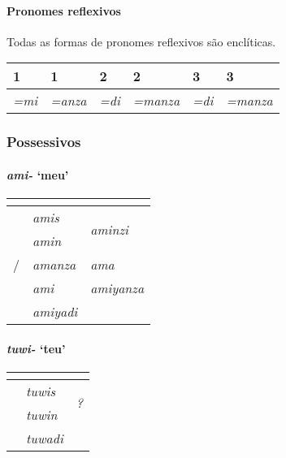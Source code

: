 \paragraph{Pronomes reflexivos}
Todas as formas de pronomes reflexivos são enclíticas.

\begin{center}
	\begin{tabular}[c]{ll|ll|ll}
		\toprule
		1\Sg{}\emph{} & 1\Pl{}\emph{} & 2\Sg{}\emph{} & 2\Pl{}\emph{} & 3\Sg{}\emph{} & 3\Pl{}\emph{} \\
		\midrule
		\emph{=mi}    & \emph{=anza}  & \emph{=di}    & \emph{=manza} & \emph{=di}    & \emph{=manza} \\
		\bottomrule
	\end{tabular}
\end{center}

\subsubsection{Possessivos}

\paragraph{\emph{ami-} `meu'}

\begin{center}
	\begin{tabular}[c]{lll}
		\toprule
		                      & \Sg{}\emph{}   & \Pl{}\emph{}                     \\
		\midrule
		\Nom{} \Com{}         & \emph{amis}    & \multirow{2}{4em}{\emph{aminzi}} \\
		\Acu{} \Com{}         & \emph{amin}    &                                  \\
		\Nom{}/\Acu{} \Neut{} & \emph{amanza}  & \emph{ama}                       \\
		\Dat{}                & \emph{ami}     & \emph{amiyanza}                  \\
		\Abl{}                & \emph{amiyadi} & \emph{}                          \\
		\bottomrule
	\end{tabular}
\end{center}

\clearpage
\paragraph{\emph{tuwi-} `teu'}
\begin{center}
	\begin{tabular}[c]{lll}
		\toprule
		              & \Sg{}\emph{}  & \Pl{}\emph{}                \\
		\midrule
		\Nom{} \Com{} & \emph{tuwis}  & \multirow{2}{4em}{\emph{?}} \\
		\Acu{} \Com{} & \emph{tuwin}  &                             \\
		\Abl{}        & \emph{tuwadi} & \emph{}                     \\
		\bottomrule
	\end{tabular}
\end{center}

